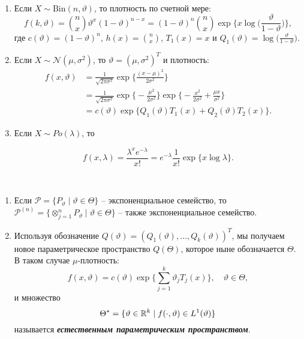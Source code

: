 \begin{exmp}\label{exmp2.34} \
	\begin{enumerate}
		\item Если $X \sim \mathrm{Bin}(n, \vartheta)$, то плотность по счетной мере:
		\[ f(k, \vartheta)=\binom{n}{x} \vartheta^x(1-\vartheta)^{n-x}=(1-\vartheta)^n \binom{n}{x} \exp\Big\{x \log\Big(\frac{\vartheta}{1-\vartheta}\Big) \Big\},  \]
		где $c(\vartheta) = (1 - \vartheta)^n$, $h(x)=\binom{n}{x}$, $T_1(x) = x$ и $Q_1(\vartheta) = \log\Big(\frac{\vartheta}{1-\vartheta}\Big)$.
		\item Если $X \sim \mathcal{N}(\mu, \sigma^2)$, то $\vartheta=(\mu, \sigma^2)^T$ и плотность:
		\[ 
		\begin{aligned}
		f(x,\vartheta)&=\frac{1}{\sqrt{2 \pi \sigma^2}} \exp\Big\{ \frac{(x-\mu)^2}{2\sigma^2} \Big\} \\
		& = \frac{1}{\sqrt{2 \pi \sigma^2}} \exp \Big \{ -\frac{\mu^2}{2\sigma^2} \Big\}  \exp\Big \{ -\frac{x^2}{2\sigma^2} +\frac{\mu x}{\sigma^2} \Big\} \\
		& = c(\vartheta) \exp \Big\{ Q_1(\vartheta) T_1(x) + Q_2(\vartheta) T_2(x)  \Big \} .
		\end{aligned}  \]
		
		\item Если $X \sim Po(\lambda)$, то

		\[ f(x, \lambda) = \frac{\lambda^x e^{-\lambda}}{x!}=e^{-\lambda} \frac{1}{x!} \exp\{x \log \lambda \}. \]
    \end{enumerate}
\end{exmp}

\begin{rmrk}\
	\begin{enumerate}
		\item Если $\mathcal{P} = \{P_\vartheta \mid \vartheta \in \Theta \}$ -- экспоненциальное семейство, то $\mathcal{P}^{(n)}=\{ \otimes_{j=1}^n P_\vartheta \mid \vartheta \in \Theta \}$ -- также экспоненциальное семейство.
		\item Используя обозначение $Q(\vartheta) = (Q_1(\vartheta), \dots, Q_k(\vartheta))^T$, мы получаем новое параметрическое пространство $Q(\Theta)$, которое ныне обозначается $\Theta$. В таком случае $\mu$-плотность:
		\[f(x,\vartheta)=c(\vartheta) \exp \Big\{ \sum_{j=1}^k \vartheta_j T_j(x) \Big\}, \quad \vartheta \in \Theta, \]
		и множество
		\[ \Theta^* = \{ \vartheta \in \mathbb{R}^k \mid f(\cdot, \vartheta) \in L^1(\vartheta) \} \]
		называется \textbf{\textit{естественным параметрическим пространством}}.
	\end{enumerate}
\end{rmrk}

